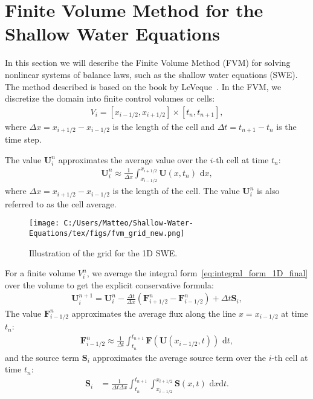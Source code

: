 \section{Finite Volume Method for the Shallow Water Equations}
In this section we will describe the Finite Volume Method (FVM) for solving nonlinear systems of balance laws, such as the shallow water equations (SWE).
The method described is based on the book by LeVeque~\cite{LeVeque2002}.
In the FVM, we discretize the domain into finite control volumes or cells:
\begin{align*}
    V_i = [x_{i-1/2}, x_{i+1/2}] \times [t_n, t_{n+1}],
\end{align*}
where $\Delta x = x_{i+1/2} - x_{i-1/2}$ is the length of the cell and $\Delta t = t_{n+1} - t_n$ is the time step.


The value $\mathbf{U}_i^n$ approximates the average value over the $i$-th cell at time $t_n$:
\begin{align}
    \mathbf{U}_i^n \approx \frac{1}{\Delta x} \int_{x_{i-1/2}}^{x_{i+1/2}} \mathbf{U}(x,t_n) \text{ d}x,
\end{align}
where $\Delta x = x_{i+1/2} - x_{i-1/2}$ is the length of the cell.
The value $\mathbf{U}_i^n$ is also referred to as the cell average.


\begin{figure}[H]
    \centering
    \texttt{[image: C:/Users/Matteo/Shallow-Water-Equations/tex/figs/fvm\_grid\_new.png]}
    \caption{Illustration of the grid for the 1D SWE.}
\end{figure}

For a finite volume $V_i^n$, we average the integral form~\eqref{eq:integral_form_1D_final} over the volume to get the explicit conservative formula:
\begin{align}\label{eq:explicit_conservative_1D_SWE}
    \mathbf{U}_i^{n+1} = \mathbf{U}_i^n - \frac{\Delta t}{\Delta x} \left( \mathbf{F}_{i+1/2}^n - \mathbf{F}_{i-1/2}^n \right) + \Delta t \mathbf{S}_i,
\end{align}
The value $\mathbf{F}_{i-1/2}^n$ approximates the average flux along the line $x = x_{i-1/2}$ at time $t_n$:
\begin{align*}
    \mathbf{F}_{i-1/2}^n \approx \frac{1}{\Delta t} \int_{t_n}^{t_{n+1}} \mathbf{F}(\mathbf{U}(x_{i-1/2},t)) \text{ d}t,
\end{align*}
and the source term $\mathbf{S}_i$ approximates the average source term over the $i$-th cell at time $t_n$:
\begin{align*}
    \mathbf{S}_i &= \frac{1}{\Delta t \Delta x} \int_{t_n}^{t_{n+1}} \int_{x_{i-1/2}}^{x_{i+1/2}} \mathbf{S}(x,t) \text{ d}x\text{d}t.
\end{align*}


